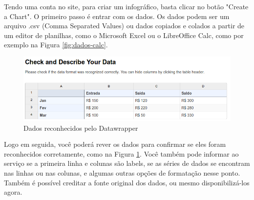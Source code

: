 \documentclass[12pt,onecolumn]{article}
\begin{document}
    Tendo uma conta no site, para criar um infográfico, basta clicar no botão 
    "Create a Chart". O primeiro passo é entrar com os dados. Os dados podem ser 
    um arquivo .csv (Comma Separated Values) ou dados copiados e colados a partir
    de um editor de planilhas, como o Microsoft Excel ou o LibreOffice Calc, como
    por exemplo na Figura \ref{fig:dados-calc}.
    
    
    \begin{figure}[H]
      \begin{center}
        \includegraphics[scale = 0.5]{datawrapper-data.png}
        \caption{Dados reconhecidos pelo Datawrapper}
        \label{fig:datawrapper-data}
      \end{center}
    \end{figure}
    
    Logo em seguida, você poderá rever os dados para confirmar se eles foram
    reconhecidos corretamente, como na Figura \ref{fig:datawrapper-data}. Você
    também pode informar ao serviço se a primeira linha e colunas são labels,
    se as séries de dados se encontram nas linhas ou nas colunas, e algumas
    outras opções de formatação nesse ponto. Também é possível creditar a
    fonte original dos dados, ou mesmo disponibilizá-los agora.
    
\end{document}
